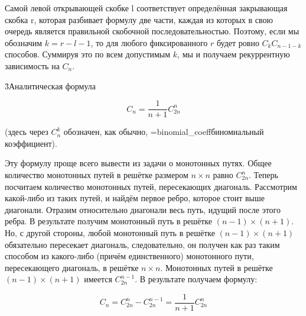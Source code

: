 Самой левой открывающей скобке l соответствует определённая закрывающая скобка r, которая разбивает формулу две части, каждая из которых в свою очередь является правильной скобочной последовательностью. Поэтому, если мы обозначим $k = r-l-1$, то для любого фиксированного $r$ будет ровно $C_k C_{n-1-k} $ способов. Суммируя это по всем допустимым $k$, мы и получаем рекуррентную зависимость на $C_n$.

\h3{Аналитическая формула}

$$ C_n = \frac{1}{n+1} C_{2n}^{n} $$

(здесь через $C_n^k$ обозначен, как обычно, \algohref=binomial_coeff{биномиальный коэффициент}).

Эту формулу проще всего вывести из задачи о монотонных путях. Общее количество монотонных путей в решётке размером $n \times n$ равно $C_{2n}^{n}$. Теперь посчитаем количество монотонных путей, пересекающих диагональ. Рассмотрим какой-либо из таких путей, и найдём первое ребро, которое стоит выше диагонали. Отразим относительно диагонали весь путь, идущий после этого ребра. В результате получим монотонный путь в решётке $(n-1) \times (n+1)$. Но, с другой стороны, любой монотонный путь в решётке $(n-1) \times (n+1)$ обязательно пересекает диагональ, следовательно, он получен как раз таким способом из какого-либо (причём единственного) монотонного пути, пересекающего диагональ, в решётке $n \times n$. Монотонных путей в решётке $(n-1) \times (n+1)$ имеется $C_{2n}^{n-1}$. В результате получаем формулу:

$$ C_n = C_{2n}^{n} - C_{2n}^{n-1} = \frac{1}{n+1} C_{2n}^{n} $$